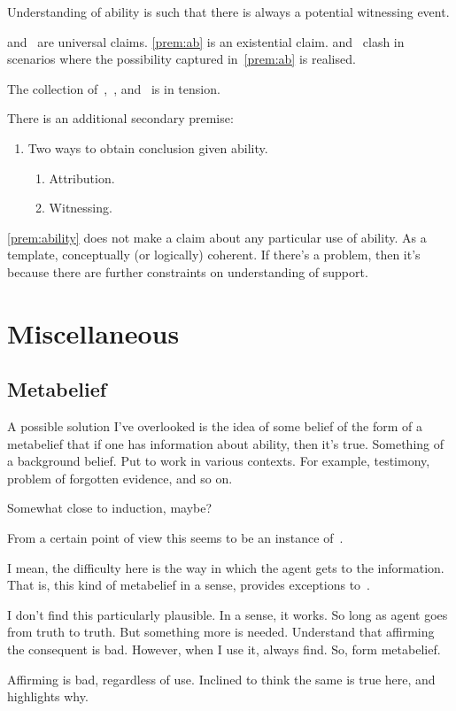 Understanding of ability is such that there is always a potential witnessing event.

\ESU{} and~\nI{} are universal claims.
\ref{prem:ab} is an existential claim.
\ESU{} and~\nI{} clash in scenarios where the possibility captured in~\ref{prem:ab} is realised.

The collection of~\ESU{},~\nI{}, and~\eA{} is in tension.

There is an additional secondary premise:

\begin{note}
\begin{enumerate}
\item\label{prem:ability} Two ways to obtain conclusion given ability.
  \begin{enumerate}
  \item Attribution.
  \item Witnessing.
  \end{enumerate}
\end{enumerate}

\ref{prem:ability} does not make a claim about any particular use of ability.
As a template, conceptually (or logically) coherent.
If there's a problem, then it's because there are further constraints on understanding of support.
\end{note}

\section{Miscellaneous}
\label{sec:misc}

\subsection{Metabelief}
\label{sec:metabelief}

\begin{note}[Idea]
  A possible solution I've overlooked is the idea of some belief of the form of a metabelief that if one has information about ability, then it's true.
  Something of a background belief.
  Put to work in various contexts.
  For example, testimony, problem of forgotten evidence, and so on.

  Somewhat close to induction, maybe?
\end{note}

\begin{note}[Reduction?]
  From a certain point of view this seems to be an instance of~\nI{}.

  I mean, the difficulty here is the way in which the agent gets to the information.
  That is, this kind of metabelief in a sense, provides exceptions to~\nI{}.

  I don't find this particularly plausible.
  In a sense, it works.
  So long as agent goes from truth to truth.
  But something more is needed.
  Understand that affirming the consequent is bad.
  However, when I use it, always find.
  So, form metabelief.

  Affirming is bad, regardless of use.
  Inclined to think the same is true here, and~\nI{} highlights why.
\end{note}

